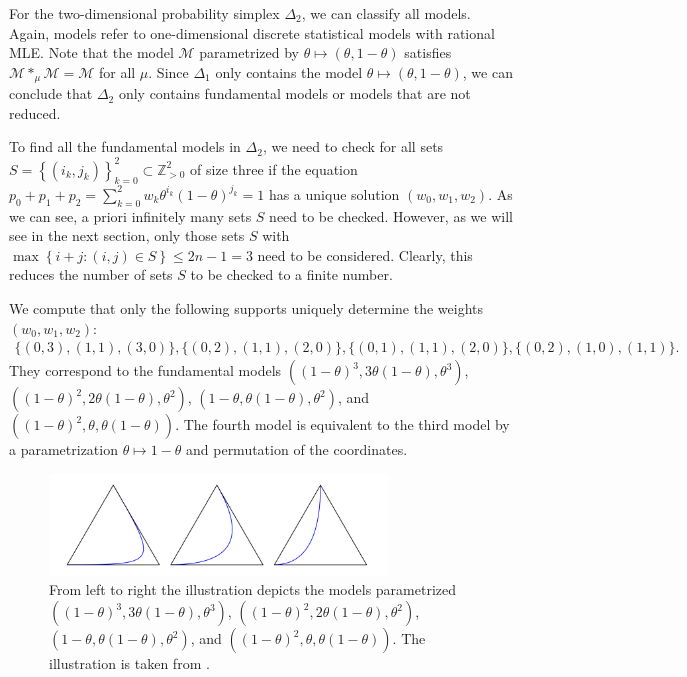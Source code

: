 \begin{example}
For the two-dimensional probability simplex \( \Delta_2 \), we can classify all models. Again, models refer to one-dimensional discrete statistical models with rational MLE. Note that the model \( \mathcal{M} \) parametrized by \( \theta \mapsto (\theta, 1-\theta) \) satisfies \( \mathcal{M} *_\mu \mathcal{M} = \mathcal{M} \) for all \( \mu \). Since \( \Delta_1 \) only contains the model \( \theta \mapsto (\theta, 1-\theta) \), we can conclude that \( \Delta_2 \) only contains fundamental models or models that are not reduced.

To find all the fundamental models in \( \Delta_2 \), we need to check for all sets \( S = \left\{ (i_k,j_k)\right\}_{k=0}^2 \subset \mathbb{Z}^2_{>0} \) of size three if the equation \( p_0 + p_1 + p_2 = \sum_{k=0}^2 w_k \theta^{i_k}(1-\theta)^{j_k} = 1 \) has a unique solution \( (w_0, w_1, w_2) \). As we can see, a priori infinitely many sets \( S \) need to be checked. However, as we will see in the next section, only those sets \( S \) with \( \max\left\{ i+j : (i,j) \in S \right\} \leq 2n -1 = 3 \) need to be considered. Clearly, this reduces the number of sets \( S \) to be checked to a finite number.

We compute that only the following supports uniquely determine the weights \( (w_0, w_1, w_2) \):
\begin{align*}
    \{ (0,3), (1,1), (3,0) \} , \{ (0,2), (1,1), (2,0) \}, \{ (0,1), (1,1), (2,0) \}, \{ (0,2),(1,0),(1,1) \}.
\end{align*}
They correspond to the fundamental models \( ((1-\theta)^3, 3\theta(1-\theta), \theta^3) \), \( ((1-\theta)^2, 2\theta(1-\theta), \theta^2) \), \( (1-\theta, \theta(1-\theta), \theta^2) \), and \( ((1-\theta)^2, \theta, \theta(1-\theta)) \). The fourth model is equivalent to the third model by a parametrization \( \theta \mapsto 1-\theta \) and permutation of the coordinates.

\begin{figure}[H]
    \centering
    \includegraphics[width=0.8\textwidth]{assets/fundamental-models-delta-2.png}
    \caption{From left to right the illustration depicts the models parametrized \( ((1-\theta)^3, 3\theta(1-\theta), \theta^3) \), \( ((1-\theta)^2, 2\theta(1-\theta), \theta^2) \), \( (1-\theta, \theta(1-\theta), \theta^2) \), and \( ((1-\theta)^2, \theta, \theta(1-\theta)) \). The illustration is taken from \cite{bik2022classifying}.}
\end{figure}


\end{example}
